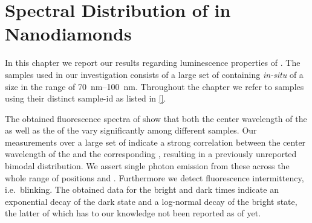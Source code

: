 
\chapter[Spectral Distribution]{Spectral Distribution of \sivs in Nanodiamonds}	\label{ch::distribution}

	In this chapter we report our results regarding luminescence properties of \sivs. The samples used in our investigation consists of a large set of \CVD \nds containing \textit{in-situ} \sivs of a size in the range of \SIrange{70}{100}{\nm}. Throughout the chapter we refer to samples using their distinct sample-id as listed in \autoref{}.

	The obtained fluorescence spectra of \sivs show that both the center wavelength of the \ZPL as well as the \lw of the \zpl vary significantly among different samples.
	Our measurements over a large set of \sivs indicate a strong correlation between the center wavelength of the \zpl and the corresponding \lws, resulting in a previously unreported bimodal distribution.
	We assert single photon emission from these \sivs across the whole range of \zpl positions and \lws.
	Furthermore we detect fluorescence intermittency, i.e.\ blinking. The obtained data for the bright and dark times indicate
	an exponential decay of the dark state and a log-normal decay of the bright state, the latter of which has to our knowledge not been reported as of yet.
